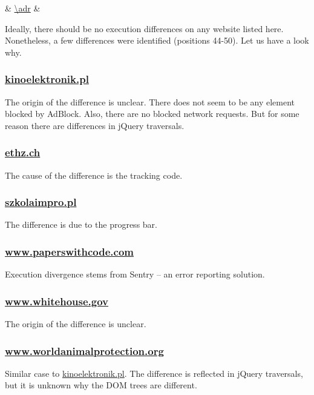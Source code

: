 %
{\thecsvrow & \url{\adr} & \cnt}%

Ideally, there should be no execution differences on any website listed here. Nonetheless, 
a few differences were identified (positions 44-50).
Let us have a look why.

\subsubsection{\url{kinoelektronik.pl}}
The origin of the difference is unclear. There does not seem to be any element
blocked by AdBlock. Also, there are no blocked network requests. 
But for some reason there are differences in jQuery traversals.

\subsubsection{\url{ethz.ch}}
The cause of the difference is the tracking code.

\subsubsection{\url{szkolaimpro.pl}}
The difference is due to the progress bar.

\subsubsection{\url{www.paperswithcode.com}}
Execution divergence stems from Sentry -- an error reporting solution.

\subsubsection{\url{www.whitehouse.gov}}
The origin of the difference is unclear.

\subsubsection{\url{www.worldanimalprotection.org}}
Similar case to \url{kinoelektronik.pl}. The difference is reflected in jQuery traversals,
but it is unknown why the DOM trees are different.


